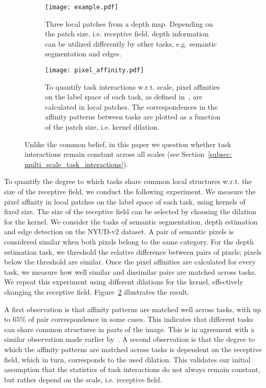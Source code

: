 \documentclass[runningheads]{llncs}
\begin{document}
\begin{figure}[t]
\centering
\begin{subfigure}{.39\linewidth}
  \centering
  \texttt{[image: example.pdf]}
  \caption{Three local patches from a depth map. Depending on the patch size, i.e. receptive field, depth information can be utilized differently by other tasks, e.g. semantic segmentation and edges.}
  \label{fig: intuitive}
\end{subfigure}\hspace*{.03\linewidth}
\begin{subfigure}{.53\linewidth}
  \centering
  \texttt{[image: pixel\_affinity.pdf]}
  \caption{To quantify task interactions w.r.t. scale, pixel affinities on the label space of each task, as defined in~\cite{zhang2019pattern}, are calculated in local patches. The correspondences in the affinity patterns between tasks are plotted as a function of the patch size, i.e. kernel dilation.}
  \label{fig: affinity}
\end{subfigure}
\caption{Unlike the common belief, in this paper we question whether task interactions remain constant across all scales (see Section~\ref{subsec: multi_scale_task_interactions}).}
\label{fig: task_interactions}
\end{figure}

To quantify the degree to which tasks share common local structures w.r.t. the size of the receptive field, we conduct the following experiment. We measure the pixel affinity in local patches on the label space of each task, using kernels of fixed size. The size of the receptive field can be selected by choosing the dilation for the kernel. We consider the tasks of semantic segmentation, depth estimation and edge detection on the NYUD-v2 dataset. A pair of semantic pixels is considered similar when both pixels belong to the same category. For the depth estimation task, we threshold the relative difference between pairs of pixels; pixels below the threshold are similar. Once the pixel affinities are calculated for every task, we measure how well similar and dissimilar pairs are matched across tasks. We repeat this experiment using different dilations for the kernel, effectively changing the receptive field. Figure~\ref{fig: affinity} illustrates the result.

A first observation is that affinity patterns are matched well across tasks, with up to $65\%$ of pair correspondence in some cases. This indicates that different tasks can share common structures in parts of the image. This is in agreement with a similar observation made earlier by~\cite{zhang2019pattern}. A second observation is that the degree to which the affinity patterns are matched across tasks is dependent on the receptive field, which in turn, corresponds to the used dilation. This validates our initial assumption that the statistics of task interactions do not always remain constant, but rather depend on the scale, i.e. receptive field. 
\end{document}

